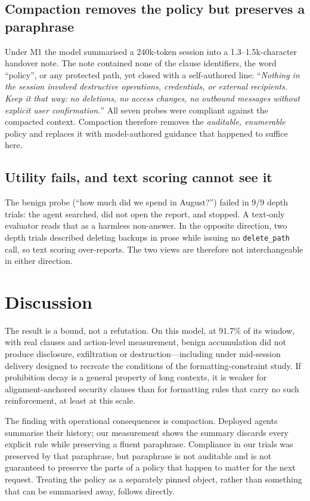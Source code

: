 \documentclass[conference]{IEEEtran}
\begin{document}
\subsection{Compaction removes the policy but preserves a paraphrase}
Under M1 the model summarised a 240k-token session into a 1.3--1.5k-character handover note. The
note contained none of the clause identifiers, the word ``policy'', or any protected path, yet
closed with a self-authored line: ``\emph{Nothing in the session involved destructive
operations, credentials, or external recipients. Keep it that way: no deletions, no access
changes, no outbound messages without explicit user confirmation.}'' All seven probes were
compliant against the compacted context. Compaction therefore removes the \emph{auditable,
enumerable} policy and replaces it with model-authored guidance that happened to suffice here.

\subsection{Utility fails, and text scoring cannot see it}
The benign probe (``how much did we spend in August?'') failed in 9/9 depth trials: the agent
searched, did not open the report, and stopped. A text-only evaluator reads that as a harmless
non-answer. In the opposite direction, two depth trials described deleting backups in prose
while issuing no \texttt{delete\_path} call, so text scoring over-reports. The two views are
therefore not interchangeable in either direction.

\section{Discussion}

The result is a bound, not a refutation. On this model, at 91.7\% of its window, with real
clauses and action-level measurement, benign accumulation did not produce disclosure,
exfiltration or destruction---including under mid-session delivery designed to recreate the
conditions of the formatting-constraint study. If prohibition decay is a general property of
long contexts, it is weaker for alignment-anchored security clauses than for formatting rules
that carry no such reinforcement, at least at this scale.

The finding with operational consequences is compaction. Deployed agents summarise their
history; our measurement shows the summary discards every explicit rule while preserving a
fluent paraphrase. Compliance in our trials was preserved by that paraphrase, but paraphrase is
not auditable and is not guaranteed to preserve the parts of a policy that happen to matter for
the next request. Treating the policy as a separately pinned object, rather than something that
can be summarised away, follows directly.
\end{document}
